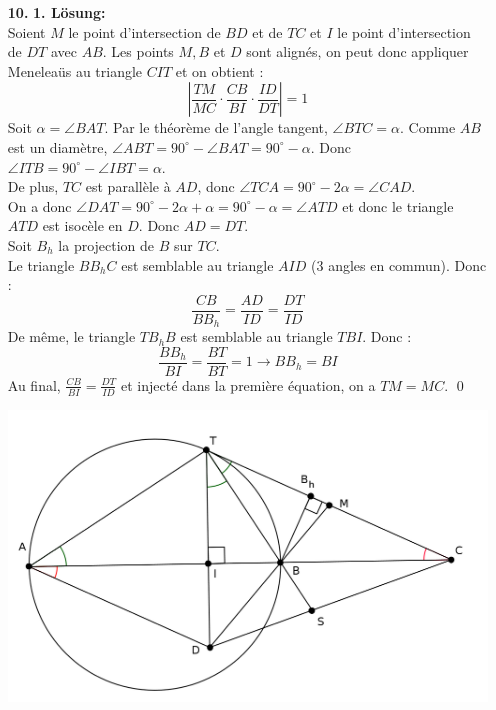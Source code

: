 \documentclass[12pt,a4paper]{article}
\theoremstyle{plain}
\theoremstyle{definition}
\begin{document}
\begin{itemize}

\textbf{2. Lösung:} Dirichlets krasses Theorem aus der Zahlentheorie besagt, dass wenn $ggT(m,T)=1$, dann gibt es unendlich viel Primzahlen, die gleich $m$ modulo $T$ sind. Seien $S$ und $T$ wie oben. Aus Dirichlets Theorem folgt, dass es eine Primzahl $p>S$ gibt mit $p \equiv 1 \ (T)$. Es gilt $a_p =1$ und $a_{p^2}=0$ und $T| p^2-p$, Widerspruch zur Periodizität.\qed

\item[\textbf{10.}]
\textbf{1. Lösung:}\\
Soient $M$ le point d'intersection de $BD$ et de $TC$ et $I$ le point d'intersection de $DT$ avec $AB$. Les points $M,B$ et $D$ sont alignés, on peut donc appliquer Meneleaüs au triangle $CIT$ et on obtient :\\
\begin{equation}
\left|\frac{TM}{MC}\cdot\frac{CB}{BI}\cdot\frac{ID}{DT}\right|=1
\end{equation}
Soit $\alpha =\angle BAT$. Par le théorème de l'angle tangent, $\angle BTC = \alpha$. Comme $AB$ est un diamètre, $\angle ABT = 90^\circ -\angle BAT = 90^\circ - \alpha$. Donc $\angle ITB = 90^\circ-\angle IBT = \alpha$.\\
De plus, $TC$ est parallèle à $AD$, donc $\angle TCA = 90^\circ -2\alpha = \angle CAD$.\\
On a donc $\angle DAT = 90^\circ-2\alpha+\alpha=90^\circ-\alpha=\angle ATD$ et donc le triangle $ ATD$ est isocèle en $D$. Donc $AD=DT$.\\
Soit $B_h$ la projection de $B$ sur $TC$.\\
Le triangle $BB_hC$ est semblable au triangle $AID$ (3 angles en commun). Donc :
\[
\frac{CB}{BB_h}=\frac{AD}{ID}=\frac{DT}{ID}
\]
De même, le triangle $TB_hB$ est semblable au triangle $TBI$. Donc :
\[
\frac{BB_h}{BI}=\frac{BT}{BT}=1 \rightarrow BB_h=BI
\]
Au final, $\frac{CB}{BI}=\frac{DT}{ID}$ et injecté dans la première équation, on a $TM=MC$. \qed
\begin{center}
\includegraphics{Finalrunde14_10.png}

\end{center}
\end{itemize}
\end{document}
